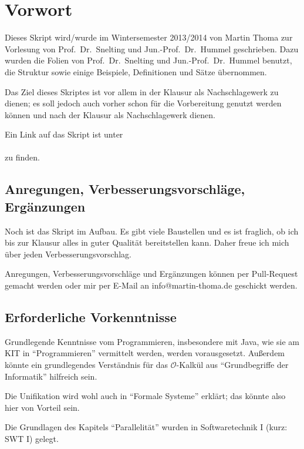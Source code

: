 \chapter*{Vorwort}
Dieses Skript wird/wurde im Wintersemester 2013/2014
von Martin Thoma zur Vorlesung von Prof.~Dr.~Snelting und Jun.-Prof.~Dr.~Hummel 
geschrieben. Dazu wurden
die Folien von Prof.~Dr.~Snelting und Jun.-Prof.~Dr.~Hummel benutzt, die Struktur
sowie einige Beispiele, Definitionen und Sätze übernommen.

Das Ziel dieses Skriptes ist vor allem
in der Klausur als Nachschlagewerk zu dienen; es soll jedoch auch
vorher schon für die Vorbereitung genutzt werden können und nach
der Klausur als Nachschlagewerk dienen.

Ein Link auf das Skript ist unter \\
\href{http://martin-thoma.com/programmierparadigmen/}{}\\
zu finden.

\section*{Anregungen, Verbesserungsvorschläge, Ergänzungen}
Noch ist das Skript im Aufbau. Es gibt viele Baustellen und es ist
fraglich, ob ich bis zur Klausur alles in guter Qualität bereitstellen
kann. Daher freue ich mich über jeden Verbesserungsvorschlag.

Anregungen, Verbesserungsvorschläge und Ergänzungen können per
Pull-Request gemacht werden oder mir per E-Mail an info@martin-thoma.de
geschickt werden.

\section*{Erforderliche Vorkenntnisse}
Grundlegende Kenntnisse vom Programmieren, insbesondere mit Java,
wie sie am KIT in \enquote{Programmieren} vermittelt werden, werden
vorausgesetzt. Außerdem könnte ein grundlegendes Verständnis für 
das $\mathcal{O}$-Kalkül aus \enquote{Grundbegriffe der Informatik} hilfreich sein.

Die Unifikation wird wohl auch in \enquote{Formale Systeme}
erklärt; das könnte also hier von Vorteil sein.

Die Grundlagen des Kapitels \enquote{Parallelität} wurden in Softwaretechnik I
(kurz: SWT I) gelegt.